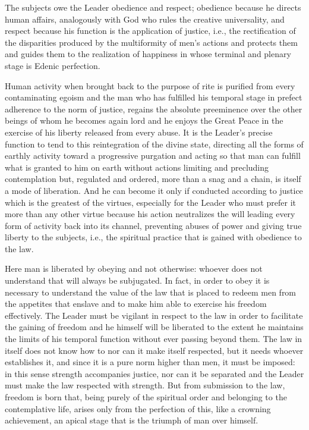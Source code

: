 The subjects owe the Leader obedience and respect; obedience because he directs human affairs, analogously with God who rules the creative universality, and respect because his function is the application of justice, i.e., the rectification of the disparities produced by the multiformity of men's actions and protects them and guides them to the realization of happiness in whose terminal and plenary stage is Edenic perfection.

Human activity when brought back to the purpose of rite is purified from every contaminating egoism and the man who has fulfilled his temporal stage in prefect adherence to the norm of justice, regains the absolute preeminence over the other beings of whom he becomes again lord and he enjoys the Great Peace in the exercise of his liberty released from every abuse. It is the Leader's precise function to tend to this reintegration of the divine state, directing all the forms of earthly activity toward a progressive purgation and acting so that man can fulfill what is granted to him on earth without actions limiting and precluding contemplation but, regulated and ordered, more than a snag and a chain, is itself a mode of liberation. And he can become it only if conducted according to justice which is the greatest of the virtues, especially for the Leader who must prefer it more than any other virtue because his action neutralizes the will leading every form of activity back into its channel, preventing abuses of power and giving true liberty to the subjects, i.e., the spiritual practice that is gained with obedience to the law.

Here man is liberated by obeying and not otherwise: whoever does not understand that will always be subjugated. In fact, in order to obey it is necessary to understand the value of the law that is placed to redeem men from the appetites that enslave and to make him able to exercise his freedom effectively. The Leader must be vigilant in respect to the law in order to facilitate the gaining of freedom and he himself will be liberated to the extent he maintains the limits of his temporal function without ever passing beyond them. The law in itself does not know how to nor can it make itself respected, but it needs whoever establishes it, and since it is a pure norm higher than men, it must be imposed: in this sense strength accompanies justice, nor can it be separated and the Leader must make the law respected with strength. But from submission to the law, freedom is born that, being purely of the spiritual order and belonging to the contemplative life, arises only from the perfection of this, like a crowning achievement, an apical stage that is the triumph of man over himself.

